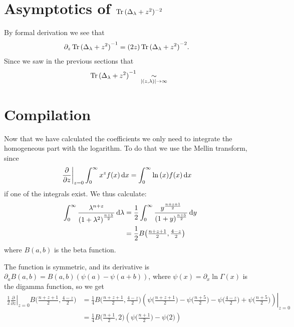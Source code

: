 \section{Asymptotics of $\Tr{(\Delta_\lambda + z^2)^{-2}}$}
By formal derivation we see that
\begin{align*}
    \partial_z\Tr{(\Delta_\lambda + z^2)}^{-1} &=
        (2z) \Tr{(\Delta_\lambda + z^2)}^{-2}
        .
\end{align*}
Since we saw in the previous sections that
\begin{align*}
    \Tr{(\Delta_\lambda + z^2)}^{-1}
        \ \SimAs{\left|(z,\lambda)\right|\to\infty}\ 
\end{align*}

\section{Compilation}
Now that we have calculated the coefficients we only need to integrate the
homogeneous part with the logarithm. To do that we use the Mellin transform,
since
\begin{align*}
    \left.\frac\partial{\partial z}\right|_{z=0}\Integ[\infty]{0}{x}{x^z f(x)}
    &= \Integ[\infty]{0}{x}{\ln{(x)} f(x)}
\end{align*}
if one of the integrals exist. We thus calculate:
\begin{align*}
    \Integ[\infty]{0}{\lambda}{\frac{\lambda^{n + z}}{\left(1 +
    \lambda^2\right)^{\frac{n+5}{2}}}} &=
    \frac12\Integ[\infty]{0}{y}{\frac{y^{\frac{n+z+1}{2}}}{(1 +
    y)^{\frac{n+5}{2}}}} \\
    &= \frac12 B\bigl(\tfrac{n+z+1}{2}, \tfrac{4-z}{2}\bigr)
\end{align*}
where $B(a,b)$ is the beta function. %

The function is symmetric, and its
derivative is $\partial_a B(a,b) = B(a,b) (\psi(a) - \psi(a+b))$, where
$\psi(x) = \partial_x \ln\Gamma(x)$ is the digamma function, so we get
\begin{align*}
    \left.\frac12\frac\partial{\partial z}\right|_{z=0} B\bigl(\tfrac{n+z+1}{2},
    \tfrac{4-z}{2}\bigr)
    &= \left.\frac14 B\bigl(\tfrac{n+z+1}{2}, \tfrac{4-z}{2}\bigr)
    \left(\psi\bigl(\tfrac{n+z+1}{2}\bigr) - \psi\bigl(\tfrac{n+5}{2}\bigr) -
    \psi\bigl(\tfrac{4-z}{2}\bigr) +
    \psi\bigl(\tfrac{n+5}{2}\bigr)\right)\right|_{z=0} \\
    &= \frac14 B\bigl(\tfrac{n+1}{2}, 2\bigr)
    \left(\psi\bigl(\tfrac{n+1}{2}\bigr) - \psi\bigl(2\bigr)\right)
\end{align*}


